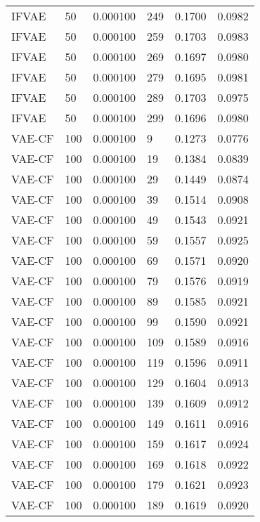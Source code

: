 \begin{tabular}{llrlrr}
   IFVAE &   50 &  0.000100 &   249 &  0.1700 &       0.0982 \\
   IFVAE &   50 &  0.000100 &   259 &  0.1703 &       0.0983 \\
   IFVAE &   50 &  0.000100 &   269 &  0.1697 &       0.0980 \\
   IFVAE &   50 &  0.000100 &   279 &  0.1695 &       0.0981 \\
   IFVAE &   50 &  0.000100 &   289 &  0.1703 &       0.0975 \\
   IFVAE &   50 &  0.000100 &   299 &  0.1696 &       0.0980 \\
  VAE-CF &  100 &  0.000100 &     9 &  0.1273 &       0.0776 \\
  VAE-CF &  100 &  0.000100 &    19 &  0.1384 &       0.0839 \\
  VAE-CF &  100 &  0.000100 &    29 &  0.1449 &       0.0874 \\
  VAE-CF &  100 &  0.000100 &    39 &  0.1514 &       0.0908 \\
  VAE-CF &  100 &  0.000100 &    49 &  0.1543 &       0.0921 \\
  VAE-CF &  100 &  0.000100 &    59 &  0.1557 &       0.0925 \\
  VAE-CF &  100 &  0.000100 &    69 &  0.1571 &       0.0920 \\
  VAE-CF &  100 &  0.000100 &    79 &  0.1576 &       0.0919 \\
  VAE-CF &  100 &  0.000100 &    89 &  0.1585 &       0.0921 \\
  VAE-CF &  100 &  0.000100 &    99 &  0.1590 &       0.0921 \\
  VAE-CF &  100 &  0.000100 &   109 &  0.1589 &       0.0916 \\
  VAE-CF &  100 &  0.000100 &   119 &  0.1596 &       0.0911 \\
  VAE-CF &  100 &  0.000100 &   129 &  0.1604 &       0.0913 \\
  VAE-CF &  100 &  0.000100 &   139 &  0.1609 &       0.0912 \\
  VAE-CF &  100 &  0.000100 &   149 &  0.1611 &       0.0916 \\
  VAE-CF &  100 &  0.000100 &   159 &  0.1617 &       0.0924 \\
  VAE-CF &  100 &  0.000100 &   169 &  0.1618 &       0.0922 \\
  VAE-CF &  100 &  0.000100 &   179 &  0.1621 &       0.0923 \\
  VAE-CF &  100 &  0.000100 &   189 &  0.1619 &       0.0920 \\

\end{tabular}
